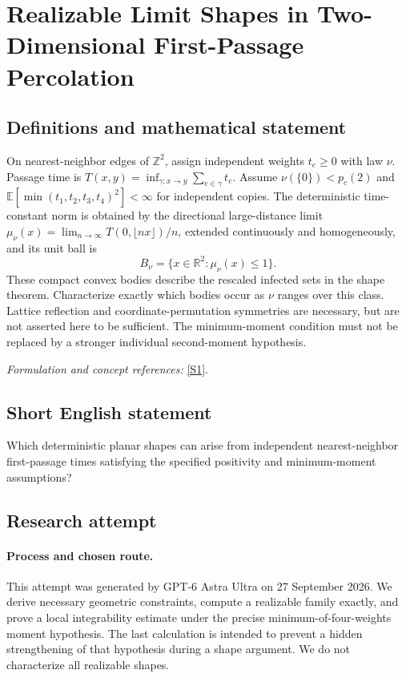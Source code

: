 \documentclass[11pt]{article}
\begin{document}
\section*{\texorpdfstring{Realizable Limit Shapes in Two-Dimensional First-Passage Percolation}{Realizable Limit Shapes in Two-Dimensional First-Passage Percolation}}\label{30006922}
\subsection{Definitions and mathematical statement}
On nearest-neighbor edges of ${\mathbb{Z}}^2$, assign independent weights $t_e\ge0$ with law $\nu$. Passage time is $T(x,y)=\inf_{\gamma:x\to y}\sum_{e\in\gamma}t_e$. Assume $\nu(\{0\})<p_c(2)$ and ${\mathbb{E}}[\min(t_1,t_2,t_3,t_4)^2]<\infty$ for independent copies. The deterministic time-constant norm is obtained by the directional large-distance limit $\mu_\nu(x)=\lim_{n\to\infty}T(0,\lfloor nx\rfloor)/n$, extended continuously and homogeneously, and its unit ball is
\[
 B_\nu=\{x\in{\mathbb{R}}^2:\mu_\nu(x)\le1\}.
\]
These compact convex bodies describe the rescaled infected sets in the shape theorem. Characterize exactly which bodies occur as $\nu$ ranges over this class. Lattice reflection and coordinate-permutation symmetries are necessary, but are not asserted here to be sufficient. The minimum-moment condition must not be replaced by a stronger individual second-moment hypothesis.
\par\smallskip\textit{Formulation and concept references:} \href{https://sites.math.duke.edu/~rtd/FPP/50yrsFPP.pdf}{[S1]}.

\subsection{Short English statement}
Which deterministic planar shapes can arise from independent nearest-neighbor first-passage times satisfying the specified positivity and minimum-moment assumptions?
\subsection{Research attempt}
\paragraph{Process and chosen route.}
This attempt was generated by GPT-6 Astra Ultra on 27 September 2026. We derive necessary geometric constraints, compute a realizable family exactly, and prove a local integrability estimate under the precise minimum-of-four-weights moment hypothesis. The last calculation is intended to prevent a hidden strengthening of that hypothesis during a shape argument. We do not characterize all realizable shapes.
\end{document}
